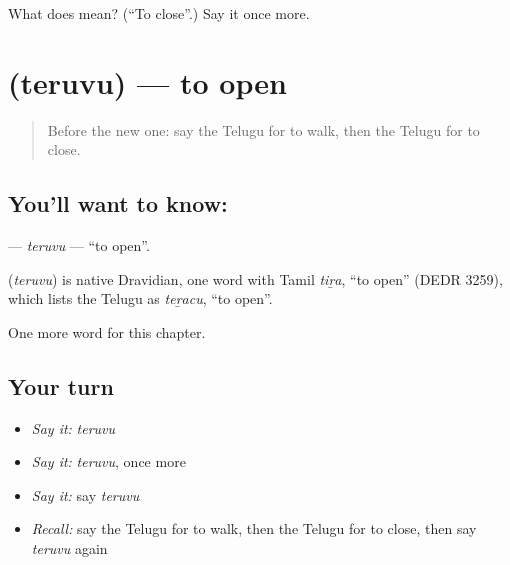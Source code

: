 \begin{tcolorbox}[breakable,colback=teal!4,colframe=teal!35!black,title={Before you move on}]
What does  mean? (\textquotedblleft{}To close\textquotedblright{}.) Say it once more.
\end{tcolorbox}
\section[\texorpdfstring{\te{తెరువు} (teruvu)}{తెరువు (teruvu)}]{ (teruvu) — to open}

\label{lesson:TE-C149-teruvu}



\begin{quote}
Before the new one: say the Telugu for to walk, then the Telugu for to close.
\end{quote}

\subsection*{You'll want to know: }
\textbf{} — \emph{teruvu} — \textquotedblleft{}to open\textquotedblright{}.

\begin{cousinweb}
\textbf{} (\emph{teruvu}) is native Dravidian, one word with Tamil \emph{tiṟa}, \textquotedblleft{}to open\textquotedblright{} (DEDR 3259), which lists the Telugu as \emph{teṟacu}, \textquotedblleft{}to open\textquotedblright{}.
\end{cousinweb}

\begin{grammarlens}[title={What you've built}]
One more word for this chapter.
\end{grammarlens}

\subsection*{Your turn}
\begin{itemize}
\raggedright
  \item \emph{Say it:} \emph{teruvu}
  \item \emph{Say it:} \emph{teruvu}, once more
  \item \emph{Say it:} say \emph{teruvu}
  \item \emph{Recall:} say the Telugu for to walk, then the Telugu for to close, then say \emph{teruvu} again
\end{itemize}

